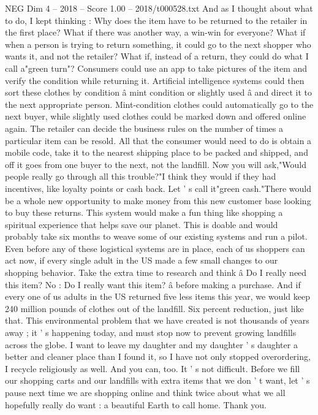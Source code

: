 \begin{textsample}{NEG Dim 4 – 2018 – Score 1.00 – 2018/t000528.txt}
And as I thought about what to do, I kept thinking : Why does the item have to be returned to the retailer in the first place?
What if there was another way, a win-win for everyone?
What if when a person is trying to return something, it could go to the next shopper who wants it, and not the retailer?
What if, instead of a return, they could do what I call a"green turn"?
Consumers could use an app to take pictures of the item and verify the condition while returning it.
Artificial intelligence systems could then sort these clothes by condition â mint condition or slightly used â and direct it to the next appropriate person.
Mint-condition clothes could automatically go to the next buyer, while slightly used clothes could be marked down and offered online again.
The retailer can decide the business rules on the number of times a particular item can be resold.
All that the consumer would need to do is obtain a mobile code, take it to the nearest shipping place to be packed and shipped, and off it goes from one buyer to the next, not the landfill.
Now you will ask,"Would people really go through all this trouble?"I think they would if they had incentives, like loyalty points or cash back.
Let ' s call it"green cash."There would be a whole new opportunity to make money from this new customer base looking to buy these returns.
This system would make a fun thing like shopping a spiritual experience that helps save our planet.
This is doable and would probably take six months to weave some of our existing systems and run a pilot.
Even before any of these logistical systems are in place, each of us shoppers can act now, if every single adult in the US made a few small changes to our shopping behavior.
Take the extra time to research and think â Do I really need this item?
No : Do I really want this item? â before making a purchase.
And if every one of us adults in the US returned five less items this year, we would keep 240 million pounds of clothes out of the landfill.
Six percent reduction, just like that.
This environmental problem that we have created is not thousands of years away ; it ' s happening today, and must stop now to prevent growing landfills across the globe.
I want to leave my daughter and my daughter ' s daughter a better and cleaner place than I found it, so I have not only stopped overordering, I recycle religiously as well.
And you can, too.
It ' s not difficult.
Before we fill our shopping carts and our landfills with extra items that we don ' t want, let ' s pause next time we are shopping online and think twice about what we all hopefully really do want : a beautiful Earth to call home.
Thank you.

\end{textsample}
